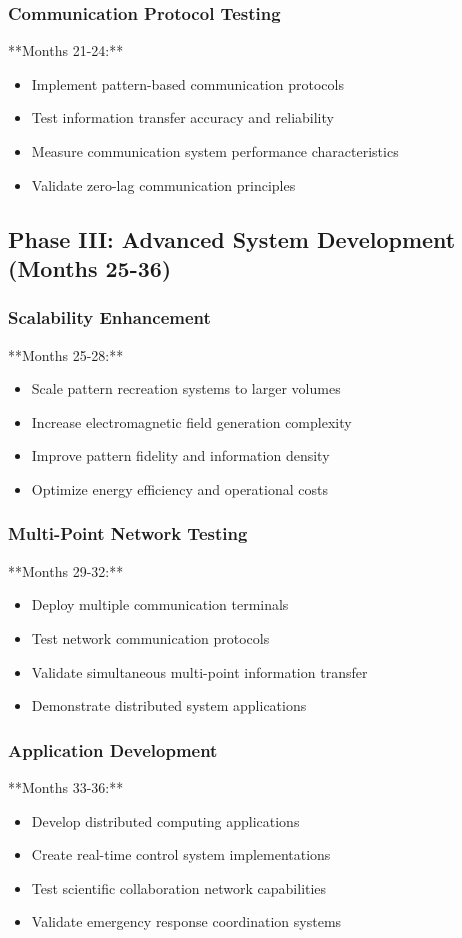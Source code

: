 \documentclass[12pt,a4paper]{article}
\begin{document}
\subsubsection{Communication Protocol Testing}
**Months 21-24:**
\begin{itemize}
\item Implement pattern-based communication protocols
\item Test information transfer accuracy and reliability
\item Measure communication system performance characteristics
\item Validate zero-lag communication principles
\end{itemize}

\subsection{Phase III: Advanced System Development (Months 25-36)}

\subsubsection{Scalability Enhancement}
**Months 25-28:**
\begin{itemize}
\item Scale pattern recreation systems to larger volumes
\item Increase electromagnetic field generation complexity
\item Improve pattern fidelity and information density
\item Optimize energy efficiency and operational costs
\end{itemize}

\subsubsection{Multi-Point Network Testing}
**Months 29-32:**
\begin{itemize}
\item Deploy multiple communication terminals
\item Test network communication protocols
\item Validate simultaneous multi-point information transfer
\item Demonstrate distributed system applications
\end{itemize}

\subsubsection{Application Development}
**Months 33-36:**
\begin{itemize}
\item Develop distributed computing applications
\item Create real-time control system implementations
\item Test scientific collaboration network capabilities
\item Validate emergency response coordination systems
\end{itemize}
\end{document}
